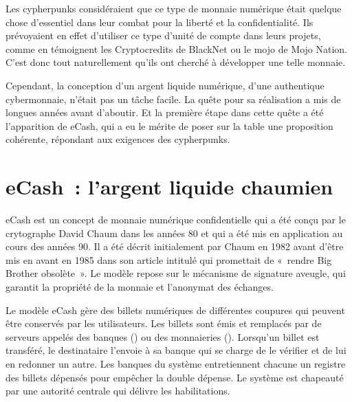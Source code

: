 Les cypherpunks considéraient que ce type de monnaie numérique était quelque chose d'essentiel dans leur combat pour la liberté et la confidentialité. Ils prévoyaient en effet d'utiliser ce type d'unité de compte dans leurs projets, comme en témoignent les Cryptocredits de BlackNet ou le mojo de Mojo Nation. C'est donc tout naturellement qu'ils ont cherché à développer une telle monnaie.

Cependant, la conception d'un argent liquide numérique, d'une authentique cybermonnaie, n'était pas un tâche facile. La quête pour sa réalisation a mis de longues années avant d'aboutir. Et la première étape dans cette quête a été l'apparition de eCash, qui a eu le mérite de poser sur la table une proposition cohérente, répondant aux exigences des cypherpunks.

\section*{eCash~: l'argent liquide chaumien}

eCash est un concept de monnaie numérique confidentielle qui a été conçu par le crytographe David Chaum dans les années 80 et qui a été mis en application au cours des années 90. Il a été décrit initialement par Chaum en 1982 avant d'être mis en avant en 1985 dans son article intitulé  qui promettait de «~rendre Big Brother obsolète~». Le modèle repose sur le mécanisme de signature aveugle, qui garantit la propriété de la monnaie et l'anonymat des échanges.

Le modèle eCash gère des billets numériques de différentes coupures qui peuvent être conservés par les utilisateurs. Les billets sont émis et remplacés par de serveurs appelés des banques () ou des monnaieries (). Lorsqu'un billet est transféré, le destinataire l'envoie à sa banque qui se charge de le vérifier et de lui en redonner un autre. Les banques du système entretiennent chacune un registre des billets dépensés pour empêcher la double dépense. Le système est chapeauté par une autorité centrale qui délivre les habilitations.

